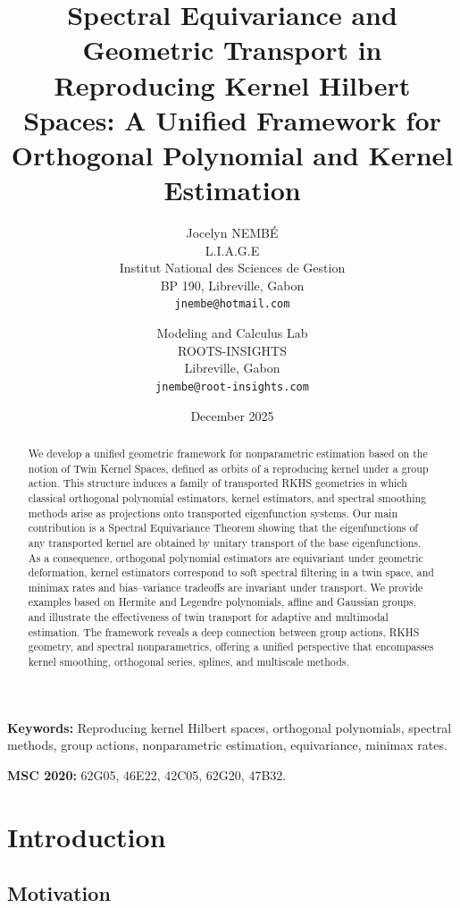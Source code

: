 \documentclass[11pt,a4paper]{article}
\title{\textbf{Spectral Equivariance and Geometric Transport in Reproducing Kernel Hilbert Spaces: A Unified Framework for Orthogonal Polynomial and Kernel Estimation}}
\author{Jocelyn NEMB\'E \\
L.I.A.G.E \\
Institut National des Sciences de Gestion \\
BP 190, Libreville, Gabon \\
\texttt{jnembe@hotmail.com} \\
\and
Modeling and Calculus Lab \\
ROOTS-INSIGHTS \\
Libreville, Gabon \\
\texttt{jnembe@root-insights.com}}
\date{December 2025}
\begin{document}
\maketitle

\begin{abstract}
We develop a unified geometric framework for nonparametric estimation based on the notion of Twin Kernel Spaces, defined as orbits of a reproducing kernel under a group action. This structure induces a family of transported RKHS geometries in which classical orthogonal polynomial estimators, kernel estimators, and spectral smoothing methods arise as projections onto transported eigenfunction systems. Our main contribution is a Spectral Equivariance Theorem showing that the eigenfunctions of any transported kernel are obtained by unitary transport of the base eigenfunctions. As a consequence, orthogonal polynomial estimators are equivariant under geometric deformation, kernel estimators correspond to soft spectral filtering in a twin space, and minimax rates and bias--variance tradeoffs are invariant under transport. We provide examples based on Hermite and Legendre polynomials, affine and Gaussian groups, and illustrate the effectiveness of twin transport for adaptive and multimodal estimation. The framework reveals a deep connection between group actions, RKHS geometry, and spectral nonparametrics, offering a unified perspective that encompasses kernel smoothing, orthogonal series, splines, and multiscale methods.
\end{abstract}

\textbf{Keywords:} Reproducing kernel Hilbert spaces, orthogonal polynomials, spectral methods, group actions, nonparametric estimation, equivariance, minimax rates.

\textbf{MSC 2020:} 62G05, 46E22, 42C05, 62G20, 47B32.

\tableofcontents

\newpage

\section{Introduction}

\subsection{Motivation}
\end{document}
